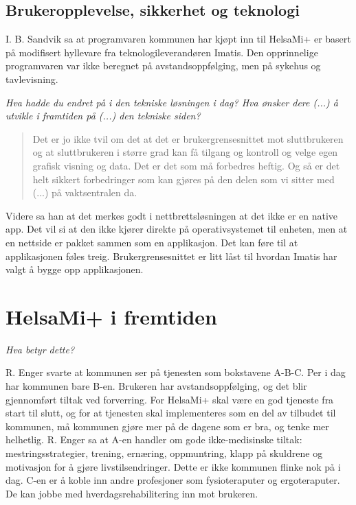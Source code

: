 \subsection{Brukeropplevelse, sikkerhet og teknologi}
I. B. Sandvik sa at programvaren kommunen har kjøpt inn til HelsaMi+ er basert på modifisert hyllevare fra teknologileverandøren Imatis. Den opprinnelige
programvaren var ikke beregnet på avstandsoppfølging, men på sykehus og tavlevisning. 

\textit{Hva hadde du endret på i den tekniske løsningen i dag? Hva ønsker dere (...) å utvikle i framtiden på (...) den tekniske siden?}

\blockquote{Det er jo ikke tvil om det at det er brukergrensesnittet mot sluttbrukeren og at sluttbrukeren i større grad kan få tilgang og
kontroll og velge egen grafisk visning og
data. Det er det som må forbedres heftig. Og så er det helt sikkert forbedringer som kan gjøres på den delen som vi sitter med
(...) på vaktsentralen da.}

Videre sa han at det merkes godt i nettbrettsløsningen at det ikke er en native app. Det vil si at den ikke kjører direkte på
operativsystemet til enheten,
men at en nettside er pakket sammen som en applikasjon. Det kan føre til at applikasjonen føles treig. Brukergrensesnittet er litt låst til
hvordan Imatis har valgt å bygge opp applikasjonen.


\section{HelsaMi+ i fremtiden}
\textit{ Hva betyr dette?}

R. Enger svarte at kommunen ser på tjenesten som bokstavene A-B-C. Per i dag har kommunen bare B-en. Brukeren har avstandsoppfølging, og det blir
gjennomført tiltak ved forverring. For HelsaMi+ skal være en god tjeneste fra start til slutt, og for at tjenesten skal
implementeres som en del av tilbudet til kommunen, må kommunen gjøre mer på de dagene som er bra,
og tenke mer helhetlig. R. Enger sa at A-en handler om gode ikke-medisinske tiltak: mestringsstrategier, trening, ernæring,
oppmuntring, klapp på skuldrene og motivasjon for å gjøre livstilsendringer. Dette er ikke kommunen flinke nok på i dag. C-en er å koble
inn andre profesjoner som fysioteraputer og ergoteraputer. De kan jobbe med hverdagsrehabilitering inn mot brukeren.

